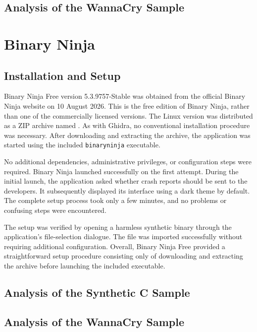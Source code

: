 \subsection{Analysis of the WannaCry Sample}
\label{subsec:analysis:ghidra:wannacry}


\section{Binary Ninja}
\label{sec:analysis:binary-ninja}

\subsection{Installation and Setup}
\label{subsec:analysis:binary-ninja:setup}
Binary Ninja Free version 5.3.9757-Stable was obtained from the official Binary Ninja website on 10 August 2026. This is the free edition of Binary Ninja, 
rather than one of the commercially licensed versions. The Linux version was distributed as a ZIP archive named . 
As with Ghidra, no conventional installation procedure was necessary. After downloading and extracting the archive, the application was started using the 
included \texttt{binaryninja} executable.

No additional dependencies, administrative privileges, or configuration steps were required. Binary Ninja launched successfully on the first attempt. 
During the initial launch, the application asked whether crash reports should be sent to the developers. It subsequently displayed its interface using a dark 
theme by default. The complete setup process took only a few minutes, and no problems or confusing steps were encountered.

The setup was verified by opening a harmless synthetic binary through the application's file-selection dialogue. The file was imported successfully without 
requiring additional configuration. Overall, Binary Ninja Free provided a straightforward setup procedure consisting only of downloading and extracting the 
archive before launching the included executable.

\subsection{Analysis of the Synthetic C Sample}
\label{subsec:analysis:binary-ninja:synthetic}

\subsection{Analysis of the WannaCry Sample}
\label{subsec:analysis:binary-ninja:wannacry}


